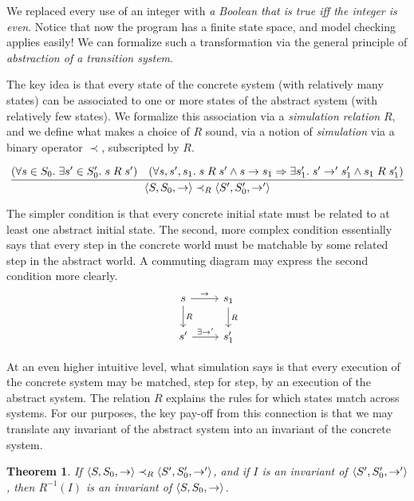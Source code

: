 \documentclass{amsbook}
\newtheorem{theorem}{Theorem}[chapter]
\theoremstyle{definition}
\theoremstyle{remark}
\numberwithin{section}{chapter}
\numberwithin{equation}{chapter}
\begin{document}
We replaced every use of an integer with \emph{a Boolean that is true iff the integer is even}.
Notice that now the program has a finite state space, and model checking applies easily!
We can formalize such a transformation via the general principle of \emph{abstraction of a transition system}.

\newcommand{\simulate}[0]{\prec}

The key idea is that every state of the concrete system (with relatively many states) can be associated to one or more states of the abstract system (with relatively few states).
We formalize this association via a \emph{simulation relation} $R$, and we define what makes a choice of $R$ sound, via a notion of \emph{simulation} via a binary operator $\simulate$, subscripted by $R$.

$$\infer{\angled{S, S_0, \to} \simulate_R \angled{S', S'_0, \to'}}{
  (\forall s \in S_0. \; \exists s' \in S'_0. \; s \; R \; s')
  & (\forall s, s', s_1. \; s \; R \; s' \land s \to s_1 \Rightarrow \exists s'_1. \; s' \to' s'_1 \land s_1 \; R \; s'_1)
}$$

The simpler condition is that every concrete initial state must be related to at least one abstract initial state.
The second, more complex condition essentially says that every step in the concrete world must be matchable by some related step in the abstract world.
A commuting diagram may express the second condition more clearly.
\[
\begin{tikzcd}
s \arrow{r}{\to} \arrow{d}{R} & s_1 \arrow{d}{R} \\
s' \arrow{r}{\exists \to'} & s'_1
\end{tikzcd}
\]

At an even higher intuitive level, what simulation says is that every execution of the concrete system may be matched, step for step, by an execution of the abstract system.
The relation $R$ explains the rules for which states match across systems.
For our purposes, the key pay-off from this connection is that we may translate any invariant of the abstract system into an invariant of the concrete system.

\newcommand{\abstraction}[0]{}

\begin{theorem}\label{abstract_simulation}
  \abstraction
  If $\angled{S, S_0, \to} \simulate_R \angled{S', S'_0, \to'}$, and if $I$ is an invariant of ${\left \langle S', S'_0, \to' \right \rangle}$, then $R^{-1}(I)$ is an invariant of ${\left \langle S, S_0, \to \right \rangle}$.
\end{theorem}
\end{document}
